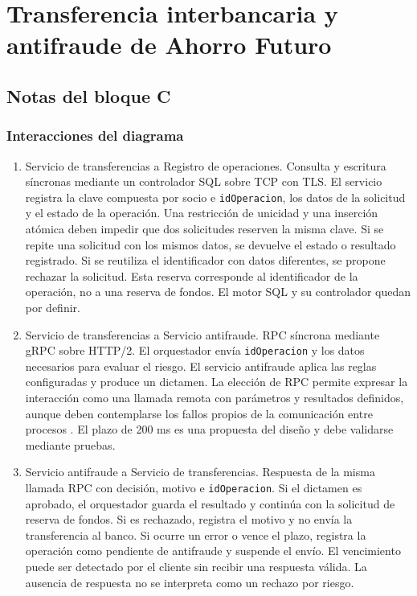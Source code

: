 \documentclass[12pt,a4paper]{article}
\begin{document}
\section{Transferencia interbancaria y antifraude de Ahorro Futuro}

\subsection{Notas del bloque C}

\subsubsection{Interacciones del diagrama}

\begin{enumerate}

    \item Servicio de transferencias a Registro de operaciones.
    Consulta y escritura síncronas mediante un controlador SQL
    sobre TCP con TLS. El servicio registra la clave compuesta
    por socio e \texttt{idOperacion}, los datos de la solicitud
    y el estado de la operación. Una restricción de unicidad y
    una inserción atómica deben impedir que dos solicitudes
    reserven la misma clave. Si se repite una solicitud con
    los mismos datos, se devuelve el estado o resultado
    registrado. Si se reutiliza el identificador con datos
    diferentes, se propone rechazar la solicitud. Esta reserva
    corresponde al identificador de la operación, no a una
    reserva de fondos. El motor SQL y su controlador quedan
    por definir.

    \item Servicio de transferencias a Servicio antifraude.
    RPC síncrona mediante gRPC sobre HTTP/2. El orquestador
    envía \texttt{idOperacion} y los datos necesarios para
    evaluar el riesgo. El servicio antifraude aplica las
    reglas configuradas y produce un dictamen. La elección
    de RPC permite expresar la interacción como una llamada
    remota con parámetros y resultados definidos, aunque
    deben contemplarse los fallos propios de la comunicación
    entre procesos \cite{birrell1984}.
    El plazo de 200 ms es una propuesta del diseño y debe
    validarse mediante pruebas.

    \item Servicio antifraude a Servicio de transferencias.
    Respuesta de la misma llamada RPC con decisión, motivo
    e \texttt{idOperacion}. Si el dictamen es aprobado,
    el orquestador guarda el resultado y continúa con la
    solicitud de reserva de fondos. Si es rechazado, registra
    el motivo y no envía la transferencia al banco. Si ocurre
    un error o vence el plazo, registra la operación como
    pendiente de antifraude y suspende el envío. El vencimiento
    puede ser detectado por el cliente sin recibir una
    respuesta válida. La ausencia de respuesta no se
    interpreta como un rechazo por riesgo.


\end{enumerate}
\end{document}
